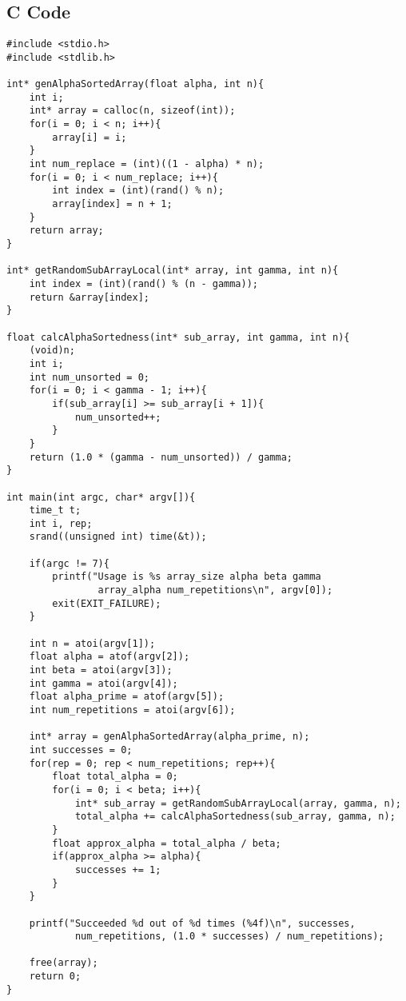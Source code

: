 \documentclass{article}
\begin{document}
\subsection{C Code}
\begin{lstlisting}
#include <stdio.h>
#include <stdlib.h>

int* genAlphaSortedArray(float alpha, int n){
    int i;
    int* array = calloc(n, sizeof(int));
    for(i = 0; i < n; i++){
        array[i] = i;
    }
    int num_replace = (int)((1 - alpha) * n);
    for(i = 0; i < num_replace; i++){
        int index = (int)(rand() % n);
        array[index] = n + 1;
    }
    return array;
}

int* getRandomSubArrayLocal(int* array, int gamma, int n){
    int index = (int)(rand() % (n - gamma));
    return &array[index];
}

float calcAlphaSortedness(int* sub_array, int gamma, int n){
    (void)n;
    int i;
    int num_unsorted = 0;
    for(i = 0; i < gamma - 1; i++){
        if(sub_array[i] >= sub_array[i + 1]){
            num_unsorted++;
        }
    }
    return (1.0 * (gamma - num_unsorted)) / gamma;
}

int main(int argc, char* argv[]){
    time_t t;
    int i, rep;
    srand((unsigned int) time(&t));

    if(argc != 7){
        printf("Usage is %s array_size alpha beta gamma 
                array_alpha num_repetitions\n", argv[0]);
        exit(EXIT_FAILURE);
    }

    int n = atoi(argv[1]);
    float alpha = atof(argv[2]);
    int beta = atoi(argv[3]);
    int gamma = atoi(argv[4]);
    float alpha_prime = atof(argv[5]);
    int num_repetitions = atoi(argv[6]);

    int* array = genAlphaSortedArray(alpha_prime, n);
    int successes = 0;
    for(rep = 0; rep < num_repetitions; rep++){
        float total_alpha = 0;
        for(i = 0; i < beta; i++){
            int* sub_array = getRandomSubArrayLocal(array, gamma, n);
            total_alpha += calcAlphaSortedness(sub_array, gamma, n);
        }
        float approx_alpha = total_alpha / beta;
        if(approx_alpha >= alpha){
            successes += 1;
        }
    }
    
    printf("Succeeded %d out of %d times (%4f)\n", successes, 
            num_repetitions, (1.0 * successes) / num_repetitions);

    free(array);
    return 0;
}
\end{lstlisting}
\end{document}

